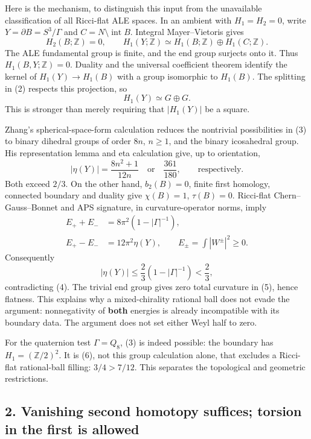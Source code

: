 \documentclass[
  11pt,
]{article}
\begin{document}
Here is the mechanism, to distinguish this input from the unavailable
classification of all Ricci-flat ALE spaces. In an ambient with
\(H_1=H_2=0\), write \(Y=\partial B=S^3/\Gamma\) and
\(C=N\setminus\operatorname{int}B\). Integral Mayer--Vietoris gives \[
 H_2(B;\mathbb Z)=0,\qquad
 H_1(Y;\mathbb Z)\simeq H_1(B;\mathbb Z)\oplus H_1(C;\mathbb Z).
 \tag{2}
\] The ALE fundamental group is finite, and the end group surjects onto
it. Thus \(H_1(B,Y;\mathbb Z)=0\). Duality and the universal coefficient
theorem identify the kernel of \(H_1(Y)\to H_1(B)\) with a group
isomorphic to \(H_1(B)\). The splitting in (2) respects this projection,
so \[
                  H_1(Y)\simeq G\oplus G.               \tag{3}
\] This is stronger than merely requiring that \(|H_1(Y)|\) be a square.

Zhang's spherical-space-form calculation reduces the nontrivial
possibilities in (3) to binary dihedral groups of order \(8n\),
\(n\ge1\), and the binary icosahedral group. His representation lemma
and eta calculation give, up to orientation, \[
 |\eta(Y)|=\frac{8n^2+1}{12n}\quad\text{or}\quad\frac{361}{180},
 \qquad\text{respectively}.                            \tag{4}
\] Both exceed \(2/3\). On the other hand, \(b_2(B)=0\), finite first
homology, connected boundary and duality give \(\chi(B)=1\),
\(\tau(B)=0\). Ricci-flat Chern--Gauss--Bonnet and APS signature, in
curvature-operator norms, imply \[
 \begin{split}
 E_++E_-&=8\pi^2\left(1-|\Gamma|^{-1}\right),\\
 E_+-E_-&=12\pi^2\eta(Y),\qquad
 E_\pm=\int|W^\pm|^2\ge0.
 \end{split}                                           \tag{5}
\] Consequently \[
 |\eta(Y)|\le\frac23\left(1-|\Gamma|^{-1}\right)<\frac23,
 \tag{6}
\] contradicting (4). The trivial end group gives zero total curvature
in (5), hence flatness. This explains why a mixed-chirality rational
ball does not evade the argument: nonnegativity of \textbf{both}
energies is already incompatible with its boundary data. The argument
does not set either Weyl half to zero.

For the quaternion test \(\Gamma=Q_8\), (3) is indeed possible: the
boundary has \(H_1=(\mathbb Z/2)^2\). It is (6), not this group
calculation alone, that excludes a Ricci-flat rational-ball filling:
\(3/4>7/12\). This separates the topological and geometric restrictions.

\hypertarget{vanishing-second-homotopy-suffices-torsion-in-the-first-is-allowed}{%
\subsection{2. Vanishing second homotopy suffices; torsion in the first
is
allowed}\label{vanishing-second-homotopy-suffices-torsion-in-the-first-is-allowed}}
\end{document}
